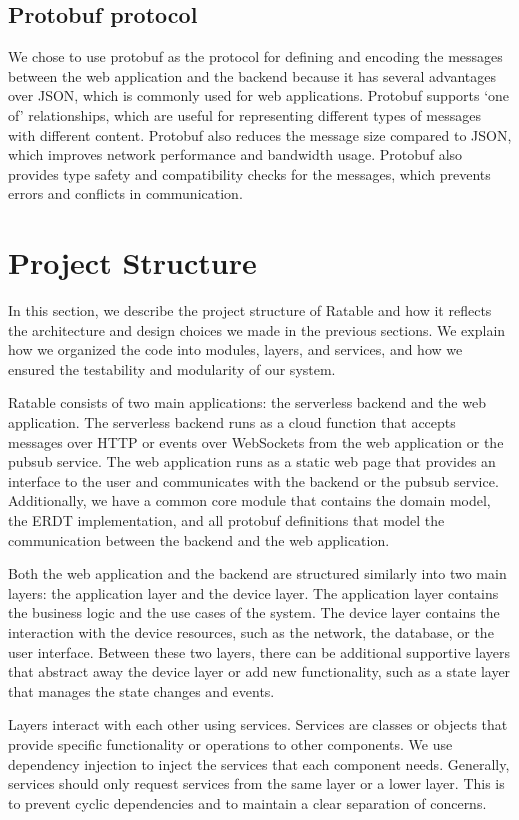 \documentclass[
	ngerman,
	ruledheaders=section,   %
	class=report,		    %
	thesis={type=bachelor}, %
	accentcolor=9c,			%
	custommargins=true,    %
	marginpar=false,        %
	parskip=half-,          %
	fontsize=11pt,          %
]{tudapub}
\begin{document}
\subsection{Protobuf protocol}
We chose to use protobuf as the protocol for defining and encoding the messages between the web application and the backend because it has several advantages over JSON, which is commonly used for web applications. Protobuf supports ‘one of’ relationships, which are useful for representing different types of messages with different content. Protobuf also reduces the message size compared to JSON, which improves network performance and bandwidth usage. Protobuf also provides type safety and compatibility checks for the messages, which prevents errors and conflicts in communication.

\section{Project Structure}
In this section, we describe the project structure of Ratable and how it reflects the architecture and design choices we made in the previous sections. We explain how we organized the code into modules, layers, and services, and how we ensured the testability and modularity of our system.

Ratable consists of two main applications: the serverless backend and the web application. The serverless backend runs as a cloud function that accepts messages over HTTP or events over WebSockets from the web application or the pubsub service. The web application runs as a static web page that provides an interface to the user and communicates with the backend or the pubsub service. Additionally, we have a common core module that contains the domain model, the ERDT implementation, and all protobuf definitions that model the communication between the backend and the web application.

Both the web application and the backend are structured similarly into two main layers: the application layer and the device layer. The application layer contains the business logic and the use cases of the system. The device layer contains the interaction with the device resources, such as the network, the database, or the user interface. Between these two layers, there can be additional supportive layers that abstract away the device layer or add new functionality, such as a state layer that manages the state changes and events.

Layers interact with each other using services. Services are classes or objects that provide specific functionality or operations to other components. We use dependency injection to inject the services that each component needs. Generally, services should only request services from the same layer or a lower layer. This is to prevent cyclic dependencies and to maintain a clear separation of concerns.
\end{document}

